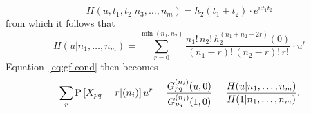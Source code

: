 \documentclass{myaptpub}%
\newcommand\Prob{\sP}
\newcommand\PR[1]{\Prob\left[#1\right]}
\begin{document}
\begin{equation}\nonumber
H(u,t_1,t_2|n_3,\ldots,n_m)=h_2(t_1+t_2)\cdot e^{ut_1t_2}
\end{equation}
from which it follows that
\begin{equation}\nonumber
H(u|n_1,\ldots,n_m)
=\sum_{r=0}^{\min(n_1,n_2)} \frac{n_1!\,n_2!\,h_2^{(n_1+n_2-2r)}(0)}{(n_1-r)!\,(n_2-r)!\,r!}\cdot u^r
\end{equation}
Equation~\eqref{eq:gf-cond} then becomes
\begin{equation}\label{eq:gf-conduni}
\sum_r \PR{X_{pq}=r|(n_i)}u^r
=\frac{G^{(n_i)}_{pq}(u,0)}{G^{(n_i)}_{pq}(1,0)}
=\frac{H(u|n_1,\ldots,n_m)}{H(1|n_1,\ldots,n_m)}.
\end{equation}




%


\end{document}
